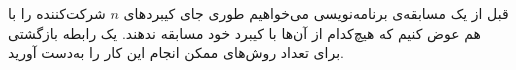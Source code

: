 \EXERCISE
قبل از یک مسابقه‌ی برنامه‌نویسی می‌خواهیم طوری جای کیبردهای
$n$
شرکت‌کننده را با هم عوض کنیم که هیچ‌کدام از آن‌ها با کیبرد خود مسابقه ندهند. یک رابطه بازگشتی برای تعداد روش‌های ممکن انجام این کار را به‌دست آورید.